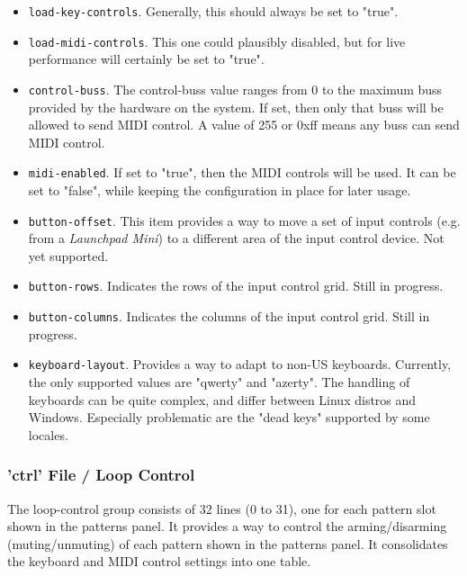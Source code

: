    \begin{itemize}
      \item \texttt{load-key-controls}.
         Generally, this should always be set to "true".
      \item \texttt{load-midi-controls}.
         This one could plausibly disabled, but for live performance will
         certainly be set to "true".
      \item \texttt{control-buss}.
         The control-buss value ranges from 0 to the maximum buss provided by
         the hardware on the system. If set, then only that buss will be allowed
         to send MIDI control.  A value of 255 or 0xff means any buss can send
         MIDI control.
      \item \texttt{midi-enabled}.
         If set to "true", then the MIDI controls will be used.
         It can be set to "false", while keeping the configuration in place
         for later usage.
      \item \texttt{button-offset}.
         This item provides a way to move a set of input controls (e.g. from a
         \textsl{Launchpad Mini}) to a different area of the input control
         device.  Not yet supported.
      \item \texttt{button-rows}.
         Indicates the rows of the input control grid.
         Still in progress.
      \item \texttt{button-columns}.
         Indicates the columns of the input control grid.
         Still in progress.
      \item \texttt{keyboard-layout}.
         Provides a way to adapt to non-US keyboards.
         Currently, the only supported values are "qwerty" and "azerty".
         The handling of keyboards can be quite complex, and differ between
         Linux distros and Windows.
         Especially problematic are the "dead keys" supported by some locales.
   \end{itemize}

\subsubsection{'ctrl' File / Loop Control}
\label{subsubsec:configuration_ctrl_loop_control}

   The loop-control group consists of 32 lines (0 to 31), one for each
   pattern slot shown in the patterns panel.
   It provides a way to control the arming/disarming (muting/unmuting) of
   each pattern shown in the patterns panel.
   It consolidates the keyboard and MIDI control settings into one table.


